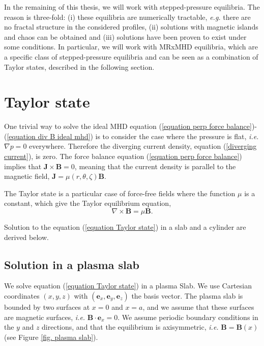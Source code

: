 \documentclass[my_thesis.tex]{subfiles}
\begin{document}
In the remaining of this thesis, we will work with stepped-pressure equilibria. The reason is three-fold: (i) these equilibria are numerically tractable, \textit{e.g.} there are no fractal structure in the considered profiles, (ii) solutions with magnetic islands and chaos can be obtained and (iii) solutions have been proven to exist under some conditions. In particular, we will work with \ac{MRxMHD} equilibria, which are a specific class of stepped-pressure equilibria and can be seen as a combination of Taylor states, described in the following section.



\section{Taylor state}
\label{section taylor state}
One trivial way to solve the ideal MHD equation (\ref{equation perp force balance})-(\ref{equation div B ideal mhd}) is to consider the case where the pressure is flat, \textit{i.e.} $\nabla p=0$ everywhere. Therefore the diverging current density, equation (\ref{diverging current}), is zero. The force balance equation (\ref{equation perp force balance}) implies that $\mathbf{J}\times\mathbf{B}=0$, meaning that the current density is parallel to the magnetic field, $\mathbf{J}=\mu(r,\theta,\zeta)\mathbf{B}$.

The Taylor state \citep{Taylor1974,Taylor1986} is a particular case of force-free fields where the function $\mu$ is a constant, which give the Taylor equilibrium equation,
\begin{equation}
	\nabla\times\mathbf{B}=\mu\mathbf{B}. \label{equation Taylor state}
\end{equation}

Solution to the equation (\ref{equation Taylor state}) in a slab and a cylinder are derived below.

\subsection{Solution in a plasma slab}
We solve equation (\ref{equation Taylor state}) in a plasma Slab. We use Cartesian coordinates $(x,y,z)$ with $(\mathbf{e}_x,\mathbf{e}_y,\mathbf{e}_z)$ the basis vector. The plasma slab is bounded by two surfaces at $x=0$ and $x=a$, and we assume that these surfaces are magnetic surfaces, \textit{i.e.} $\mathbf{B}\cdot\mathbf{e}_x=0$. We assume periodic boundary conditions in the $y$ and $z$ directions, and that the equilibrium is axisymmetric, \textit{i.e.} $\mathbf{B}=\mathbf{B}(x)$ (see Figure \ref{fig. plasma slab}).
\end{document}
